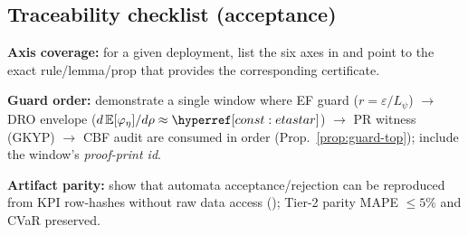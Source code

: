 \subsection{Traceability checklist (acceptance)}\label{subsec:rel-accept}
\begin{acceptchecks}
\item \textbf{Axis coverage:} for a given deployment, list the six axes in  and point to the exact rule/lemma/prop that provides the corresponding certificate.
\item \textbf{Guard order:} demonstrate a single window where EF guard ($r=\varepsilon/L_\psi$) $\rightarrow$ DRO envelope ($d\,\mathbb E[\varphi_\eta]/d\rho\approx\constref{etastar}$) $\rightarrow$ PR witness (GKYP) $\rightarrow$ CBF audit are consumed in order (Prop.~\ref{prop:guard-top}); include the window’s \emph{proof-print id}.
\item \textbf{Artifact parity:} show that automata acceptance/rejection can be reproduced from KPI row-hashes without raw data access (); Tier-2 parity MAPE $\le5\%$ and CVaR preserved.
\end{acceptchecks}
